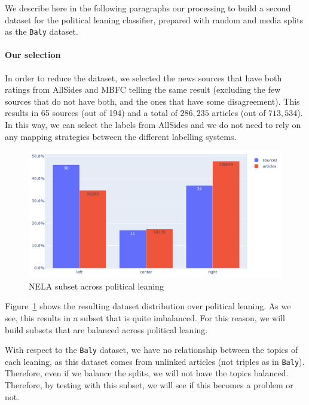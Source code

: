 We describe here in the following paragraphs our processing to build a second dataset for the political leaning classifier, prepared with random and media splits as the \texttt{Baly} dataset.

\paragraph{Our selection}

In order to reduce the dataset, we selected the news sources that have both ratings from AllSides and MBFC telling the same result (excluding the few sources that do not have both, and the ones that have some disagreement).
This results in 65 sources (out of 194) and a total of $286,235$ articles (out of $713,534$).
In this way, we can select the labels from AllSides and we do not need to rely on any mapping strategies between the different labelling systems.

\begin{figure}[!htbp]
    \centering
    \includegraphics[width=\linewidth]{figures/nela_subset_allsides_simplified.pdf}
    \caption{NELA subset across political leaning}
    \label{fig:nela_subset_allsides_simplified}
\end{figure}

Figure~\ref{fig:nela_subset_allsides_simplified} shows the resulting dataset distribution over political leaning. As we see, this results in a subset that is quite imbalanced. For this reason, we will build subsets that are balanced across political leaning.

With respect to the \texttt{Baly} dataset, we have no relationship between the topics of each leaning, as this dataset comes from unlinked articles (not triples as in \texttt{Baly}). Therefore, even if we balance the splits, we will not have the topics balanced.
Therefore, by testing with this subset, we will see if this becomes a problem or not.

